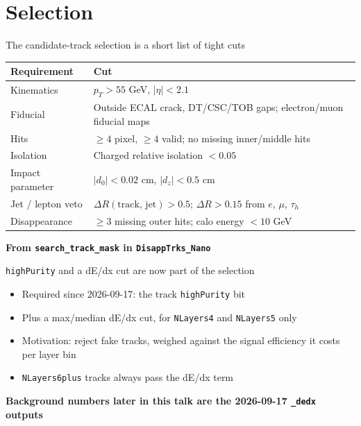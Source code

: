 \documentclass[aspectratio=169,12pt]{beamer}
\newcommand{\takeaway}[1]{\par\vspace{10pt}\centering\small\textbf{#1}\par}
\begin{document}
\section{Selection}
\begin{frame}{The candidate-track selection is a short list of tight cuts}
  \centering
  \renewcommand{\arraystretch}{0.85}
  \begin{tabular}{p{}p{}}
    \toprule
    Requirement & Cut \\
    \midrule
    Kinematics & $p_T > 55$ GeV, $|\eta| < 2.1$ \\
    Fiducial & Outside ECAL crack, DT/CSC/TOB gaps; electron/muon fiducial maps \\
    Hits & $\ge 4$ pixel, $\ge 4$ valid; no missing inner/middle hits \\
    Isolation & Charged relative isolation $< 0.05$ \\
    Impact parameter & $|d_0| < 0.02$ cm, $|d_z| < 0.5$ cm \\
    Jet / lepton veto & $\Delta R(\text{track, jet}) > 0.5$; $\Delta R > 0.15$ from $e$, $\mu$, $\tau_h$ \\
    Disappearance & $\ge 3$ missing outer hits; calo energy $< 10$ GeV \\
    \bottomrule
  \end{tabular}
  \takeaway{From \texttt{search\_track\_mask} in \texttt{DisappTrks\_Nano}}
\end{frame}

\begin{frame}{\texttt{highPurity} and a dE/dx cut are now part of the selection}
  \begin{itemize}
    \item Required since 2026-09-17: the track \texttt{highPurity} bit
    \item Plus a max/median dE/dx cut, for \texttt{NLayers4} and \texttt{NLayers5} only
    \item Motivation: reject fake tracks, weighed against the signal efficiency it costs
          per layer bin
    \item \texttt{NLayers6plus} tracks always pass the dE/dx term
  \end{itemize}
  \takeaway{Background numbers later in this talk are the 2026-09-17 \texttt{\_dedx} outputs}
\end{frame}

\end{document}
